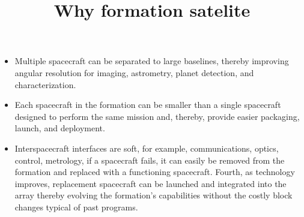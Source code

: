 \documentclass{article}
\title{Why formation satelite}
\begin{document}
\maketitle
\begin{itemize}
	\item Multiple spacecraft can be separated to large baselines, thereby improving angular resolution for imaging, astrometry, planet detection, and characterization.
	\item Each spacecraft in the formation can be smaller than a single spacecraft designed to perform the same mission and, thereby, provide easier packaging, launch, and deployment.
	\item Interspacecraft interfaces are soft, for example, communications, optics, control, metrology, if a spacecraft fails, it can easily be removed from the formation and replaced with a functioning spacecraft. Fourth, as technology improves, replacement spacecraft can be launched and integrated into the array thereby evolving the formation’s capabilities without the costly block changes typical of past programs.
\end{itemize}
\end{document}
